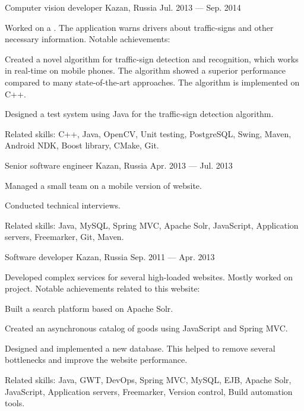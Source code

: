 \begin{cventries}
  \cventry
    {Computer vision developer} %
    {} %
    {Kazan, Russia} %
    {Jul. 2013 --- Sep. 2014} %
    {
    Worked on a . The application warns drivers about traffic-signs and other necessary information. Notable achievements:
      \begin{cvitems}
      \item{Created a novel algorithm for traffic-sign detection and recognition, which works in real-time on mobile phones. The algorithm showed a superior performance compared to many state-of-the-art approaches. The algorithm is implemented on C++.}
      \item{Designed a test system using Java for the traffic-sign detection algorithm.}
      \end{cvitems}
      Related skills: C++, Java, OpenCV, Unit testing, PostgreSQL, Swing, Maven, Android NDK, Boost library, CMake, Git.
    }
    
  \cventry
    {Senior software engineer} %
    {} %
    {Kazan, Russia} %
    {Apr. 2013 --- Jul. 2013} %
    {
      \begin{cvitems_up}
      \item{Managed a small team on a mobile version of  website.}
      \item{Conducted technical interviews.}
      \end{cvitems_up}
      Related skills: Java, MySQL, Spring MVC, Apache Solr, JavaScript, Application servers, Freemarker, Git, Maven.
    }

  \cventry
    {Software developer} %
    {} %
    {Kazan, Russia} %
    {Sep. 2011 --- Apr. 2013} %
    {
    Developed complex services for several high-loaded websites. Mostly worked on  project. Notable achievements related to this website:
      \begin{cvitems}          
      \item{Built a search platform based on Apache Solr.}
      \item{Created an asynchronous catalog of goods using JavaScript and Spring MVC.}
      \item{Designed and implemented a new database. This helped to remove several bottlenecks and improve the website performance.}
      \end{cvitems}
	Related skills: Java, GWT, DevOps, Spring MVC, MySQL, EJB, Apache Solr, JavaScript, Application servers, Freemarker, Version control, Build automation tools.
    }
\end{cventries}
